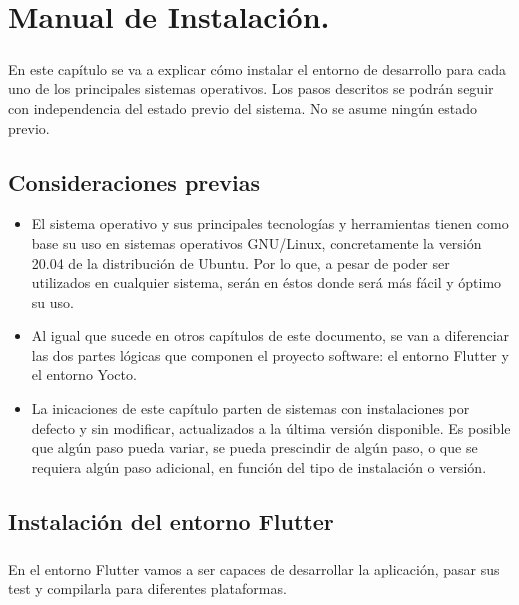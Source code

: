 \chapter{Manual de Instalación.}\label{sec:ManualDeInstalacion}

\paragraph{}En este capítulo se va a explicar cómo instalar el entorno de desarrollo
para cada uno de los principales sistemas operativos. Los pasos descritos se podrán
seguir con independencia del estado previo del sistema. No se asume ningún estado previo.

\section{Consideraciones previas}

\begin{itemize}
    \item El sistema operativo y sus principales tecnologías y herramientas tienen
    como base su uso en sistemas operativos GNU/Linux, concretamente la versión 20.04 de
    la distribución de Ubuntu. Por lo que, a pesar de poder ser utilizados en cualquier
    sistema, serán en éstos donde será más fácil y óptimo su uso.

    \item Al igual que sucede en otros capítulos de este documento, se van a diferenciar
    las dos partes lógicas que componen el proyecto software: el entorno Flutter y el
    entorno Yocto.

    \item La inicaciones de este capítulo parten de sistemas con instalaciones por defecto
    y sin modificar, actualizados a la última versión disponible. Es posible que algún
    paso pueda variar, se pueda prescindir de algún paso, o que se requiera algún paso
    adicional, en función del tipo de instalación o versión.
\end{itemize}

\section{Instalación del entorno Flutter}\label{sec:entflutter}

\paragraph{}En el entorno Flutter vamos a ser capaces de desarrollar la aplicación,
pasar sus test y compilarla para diferentes plataformas.


